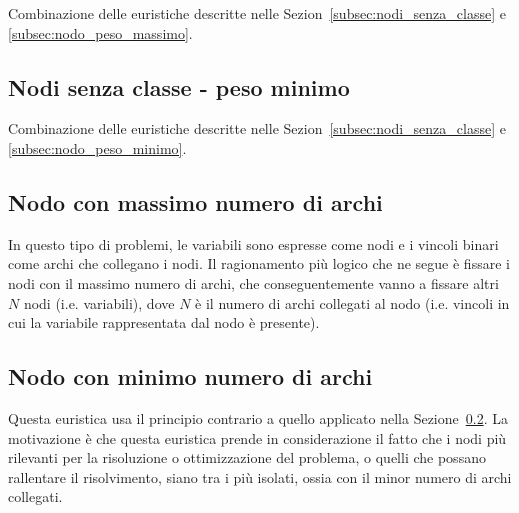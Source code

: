 Combinazione delle euristiche descritte nelle Sezion~\ref{subsec:nodi_senza_classe} e \ref{subsec:nodo_peso_massimo}.

\subsection{Nodi senza classe - peso minimo}

Combinazione delle euristiche descritte nelle Sezion~\ref{subsec:nodi_senza_classe} e \ref{subsec:nodo_peso_minimo}.

\subsection{Nodo con massimo numero di archi}\label{subsec:nodo_massimo_numero_archi}

In questo tipo di problemi, le variabili sono espresse come nodi e i vincoli binari come archi che collegano i nodi. Il ragionamento più logico che ne segue è fissare i nodi con il massimo numero di archi, che conseguentemente vanno a fissare altri $N$ nodi (i.e. variabili), dove $N$ è il numero di archi collegati al nodo (i.e. vincoli in cui la variabile rappresentata dal nodo è presente).

\subsection{Nodo con minimo numero di archi}

Questa euristica usa il principio contrario a quello applicato nella Sezione~\ref{subsec:nodo_massimo_numero_archi}. La motivazione è che questa euristica prende in considerazione il fatto che i nodi più rilevanti per la risoluzione o ottimizzazione del problema, o quelli che possano rallentare il risolvimento, siano tra i più isolati, ossia con il minor numero di archi collegati.